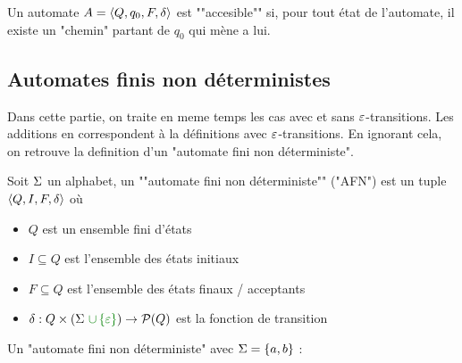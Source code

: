 \begin{definition}
	Un automate $A = \langle Q, q_0, F, \delta \rangle$ est ""accesible"" si, pour tout état de l'automate, il existe un "chemin" partant de
	$q_0$ qui mène a lui.
\end{definition}

\subsection{Automates finis non déterministes }

Dans cette partie, on traite en meme temps les cas avec et sans $\varepsilon$-transitions. Les additions en
 correspondent à la définitions avec $\varepsilon$-transitions. En ignorant cela, on retrouve la
definition d'un "automate fini non déterministe".

\begin{definition}
	Soit $\Sigma$ un alphabet, un ""automate fini non déterministe"" ("AFN") est un tuple $\langle Q, I, F, \delta \rangle$ où
	\begin{itemize}
		\item $Q$ est un ensemble fini d'états
		\item $I \subseteq Q$ est l'ensemble des états initiaux
		\item $F \subseteq Q$ est l'ensemble des états finaux / acceptants
		\item $\delta : Q \times (\alphabet \darkgreen {\ \cup \set\motvide}) \to \mathcal{P}(Q)$ est la fonction de transition
	\end{itemize}
\end{definition}


\begin{exemple}
	Un "automate fini non déterministe" avec $\Sigma = \left\{a, b\right\}$ :
	\begin{center}
		\begin{automata}

		\end{automata}
	\end{center}
\end{exemple}


